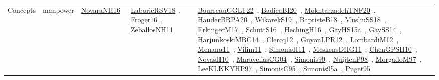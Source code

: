 {\begin{longtable}{lp{3cm}>{\raggedright\arraybackslash}p{6cm}>{\raggedright\arraybackslash}p{6cm}>{\raggedright\arraybackslash}p{8cm}}
\index{manpower}\index{Concepts!manpower}Concepts & manpower & \href{../works/NovaraNH16.pdf}{NovaraNH16}~\cite{NovaraNH16} & \href{../works/LaborieRSV18.pdf}{LaborieRSV18}~\cite{LaborieRSV18}, \href{../works/Froger16.pdf}{Froger16}~\cite{Froger16}, \href{../works/ZeballosNH11.pdf}{ZeballosNH11}~\cite{ZeballosNH11} & \href{../works/BourreauGGLT22.pdf}{BourreauGGLT22}~\cite{BourreauGGLT22}, \href{../works/BadicaBI20.pdf}{BadicaBI20}~\cite{BadicaBI20}, \href{../works/MokhtarzadehTNF20.pdf}{MokhtarzadehTNF20}~\cite{MokhtarzadehTNF20}, \href{../works/HauderBRPA20.pdf}{HauderBRPA20}~\cite{HauderBRPA20}, \href{../works/WikarekS19.pdf}{WikarekS19}~\cite{WikarekS19}, \href{../works/BaptisteB18.pdf}{BaptisteB18}~\cite{BaptisteB18}, \href{../works/MusliuSS18.pdf}{MusliuSS18}~\cite{MusliuSS18}, \href{../works/ErkingerM17.pdf}{ErkingerM17}~\cite{ErkingerM17}, \href{../works/SchuttS16.pdf}{SchuttS16}~\cite{SchuttS16}, \href{../works/HechingH16.pdf}{HechingH16}~\cite{HechingH16}, \href{../works/GayHS15a.pdf}{GayHS15a}~\cite{GayHS15a}, \href{../works/GaySS14.pdf}{GaySS14}~\cite{GaySS14}, \href{../works/HarjunkoskiMBC14.pdf}{HarjunkoskiMBC14}~\cite{HarjunkoskiMBC14}, \href{../works/Clercq12.pdf}{Clercq12}~\cite{Clercq12}, \href{../works/GuyonLPR12.pdf}{GuyonLPR12}~\cite{GuyonLPR12}, \href{../works/LombardiM12.pdf}{LombardiM12}~\cite{LombardiM12}, \href{../works/Menana11.pdf}{Menana11}~\cite{Menana11}, \href{../works/Vilim11.pdf}{Vilim11}~\cite{Vilim11}, \href{../works/SimonisH11.pdf}{SimonisH11}~\cite{SimonisH11}, \href{../works/MeskensDHG11.pdf}{MeskensDHG11}~\cite{MeskensDHG11}, \href{../works/ChenGPSH10.pdf}{ChenGPSH10}~\cite{ChenGPSH10}, \href{../works/NovasH10.pdf}{NovasH10}~\cite{NovasH10}, \href{../works/MaraveliasCG04.pdf}{MaraveliasCG04}~\cite{MaraveliasCG04}, \href{../works/Simonis99.pdf}{Simonis99}~\cite{Simonis99}, \href{../works/NuijtenP98.pdf}{NuijtenP98}~\cite{NuijtenP98}, \href{../works/MorgadoM97.pdf}{MorgadoM97}~\cite{MorgadoM97}, \href{../works/LeeKLKKYHP97.pdf}{LeeKLKKYHP97}~\cite{LeeKLKKYHP97}, \href{../works/SimonisC95.pdf}{SimonisC95}~\cite{SimonisC95}, \href{../works/Simonis95a.pdf}{Simonis95a}~\cite{Simonis95a}, \href{../works/Puget95.pdf}{Puget95}~\cite{Puget95}\\

\end{longtable}}
